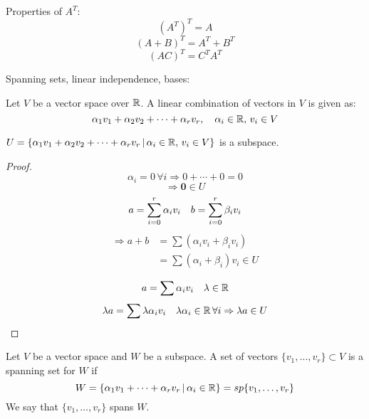 \documentclass[a4paper,10pt]{article}
\begin{document}
Properties of $A^T$:
\[
	{(A^T)}^T = A
\]
\[
	{(A+B)}^T = A^T + B^T
\]
\[
	{(AC)}^T = C^T A^T
\]

Spanning sets, linear independence, bases:

\begin{defn}
	Let $V$ be a vector space over $\mathbb{R}$. A linear combination of vectors in $V$ is given as:
	\[
		\alpha_1 v_1 + \alpha_2 v_2 + \cdots + \alpha_r v_r, \quad
		\alpha_i \in \mathbb{R}, \, v_i \in V
	\]
\end{defn}

\begin{prop}
	$U = \{
		\alpha_1 v_1 + \alpha_2 v_2 + \cdots + \alpha_r v_r \, | \,
		\alpha_i \in \mathbb{R}, \, v_i \in V
	\}$ is a subspace.
\end{prop}

\begin{proof}
	\[
		\alpha_i = 0 \, \forall i \Rightarrow 0 + \cdots + 0 = 0
	\]
	\[
		\Rightarrow \bm{0} \in U
	\]
	\[
		a = \sum_{i=0}^r \alpha_i v_i \quad
		b = \sum_{i=0}^r \beta_i v_i \\
	\]
	\begin{align*}
		\Rightarrow a + b &= \sum (\alpha_i v_i + \beta_i v_i) \\
		&= \sum (\alpha_i + \beta_i) v_i \in U
	\end{align*}

	\[
		a = \sum \alpha_i v_i \quad \lambda \in \mathbb{R}
	\]
	\[
		\lambda a = \sum \lambda \alpha_i v_i \quad
		\lambda \alpha_i \in \mathbb{R} \, \forall i
		\Rightarrow \lambda a \in U
	\]
\end{proof}

\begin{defn}
	Let $V$ be a vector space and $W$ be a subspace. A set of vectors
	$\{v_1, \ldots, v_r\} \subset V$ is a spanning set for $W$ if
	\[
		W =
		\{\alpha_1 v_1 + \cdots + \alpha_r v_r \, | \, \alpha_i \in \mathbb{R}\}
		= sp\{v_1, \ldots, v_r\}
	\]
	We say that $\{v_1, \ldots, v_r\}$ spans $W$.
\end{defn}
\end{document}
